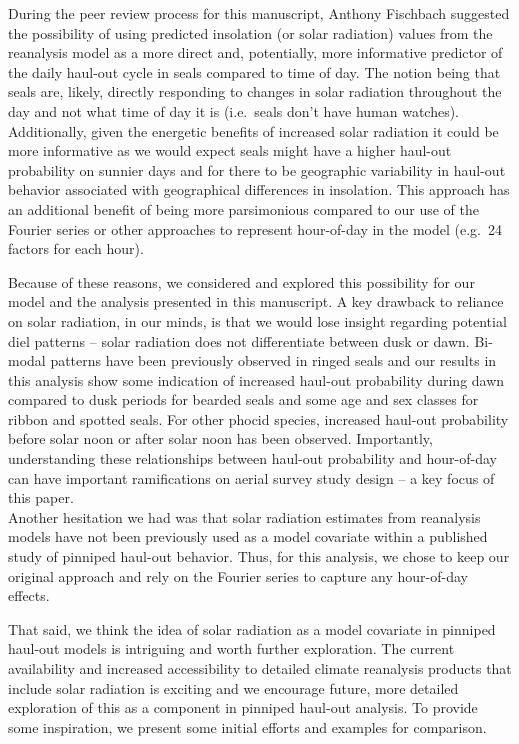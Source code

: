 \documentclass[fleqn,10pt,lineno]{wlpeerj} %
\begin{document}
During the peer review process for this manuscript, Anthony Fischbach suggested
the possibility of using predicted insolation (or solar radiation) values from
the reanalysis model as a more direct and, potentially, more informative
predictor of the daily haul-out cycle in seals compared to time of day. The
notion being that seals are, likely, directly responding to changes in solar radiation
throughout the day and not what time of day it is (i.e.~seals don't have human
watches). Additionally, given the energetic benefits of increased solar
radiation it could be more informative as we would expect seals might have a
higher haul-out probability on sunnier days and for there to be geographic
variability in haul-out behavior associated with geographical differences in
insolation. This approach has an additional benefit of being more parsimonious
compared to our use of the Fourier series or other approaches to represent
hour-of-day in the model (e.g.~24 factors for each hour).

Because of these reasons, we considered and explored this
possibility for our model and the analysis presented in this manuscript. A key
drawback to reliance on solar radiation, in our minds, is that we would lose
insight regarding potential diel patterns -- solar radiation does not
differentiate between dusk or dawn. Bi-modal patterns have been
previously observed in ringed seals and our results in this analysis show some indication of
increased haul-out probability during dawn compared to dusk periods for bearded seals
and some age and sex classes for ribbon and spotted seals.
For other phocid species, increased haul-out probability before solar noon or after
solar noon has been observed. Importantly, understanding these relationships
between haul-out probability and hour-of-day can have important ramifications
on aerial survey study design -- a key focus of this paper.\\
Another hesitation we had was that solar radiation estimates from reanalysis models have
not been previously used as a model covariate within a published study of
pinniped haul-out behavior. Thus, for this analysis, we chose to keep our
original approach and rely on the Fourier series to capture any hour-of-day
effects.

That said, we think the idea of solar radiation as a model covariate in pinniped
haul-out models is intriguing and worth further exploration. The current
availability and increased accessibility to detailed climate reanalysis
products that include solar radiation is exciting and we encourage future, more
detailed exploration of this as a component in pinniped haul-out analysis. To
provide some inspiration, we present some initial efforts and examples for
comparison.
\end{document}
